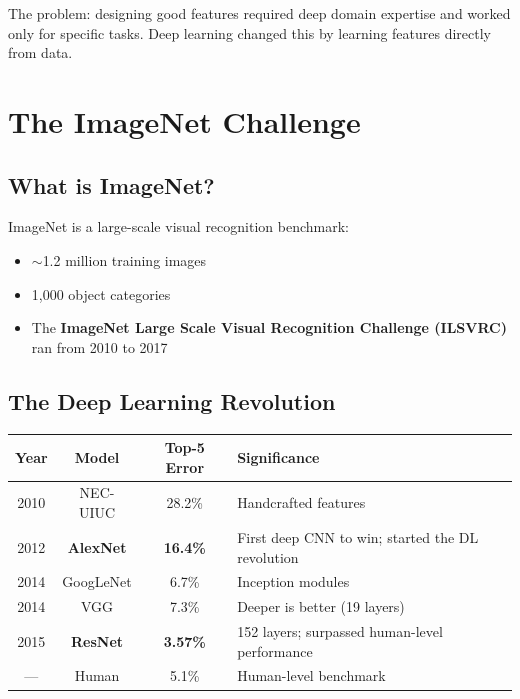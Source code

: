 \documentclass[11pt,a4paper]{article}
\begin{document}
The problem: designing good features required deep domain expertise and worked only for specific tasks. Deep learning changed this by learning features directly from data.

\section{The ImageNet Challenge}

\subsection{What is ImageNet?}

ImageNet is a large-scale visual recognition benchmark:
\begin{itemize}[leftmargin=1.5em]
    \item $\sim$1.2 million training images
    \item 1,000 object categories
    \item The \textbf{ImageNet Large Scale Visual Recognition Challenge (ILSVRC)} ran from 2010 to 2017
\end{itemize}

\subsection{The Deep Learning Revolution}

\begin{center}
\renewcommand{\arraystretch}{1.3}
\begin{tabular}{@{}cccp{5cm}@{}}
\toprule
\textbf{Year} & \textbf{Model} & \textbf{Top-5 Error} & \textbf{Significance} \\
\midrule
2010 & NEC-UIUC & 28.2\% & Handcrafted features \\
2012 & \textbf{AlexNet} & \textbf{16.4\%} & First deep CNN to win; started the DL revolution \\
2014 & GoogLeNet & 6.7\% & Inception modules \\
2014 & VGG & 7.3\% & Deeper is better (19 layers) \\
2015 & \textbf{ResNet} & \textbf{3.57\%} & 152 layers; surpassed human-level performance \\
\midrule
--- & Human & 5.1\% & Human-level benchmark \\
\bottomrule
\end{tabular}
\end{center}
\end{document}
